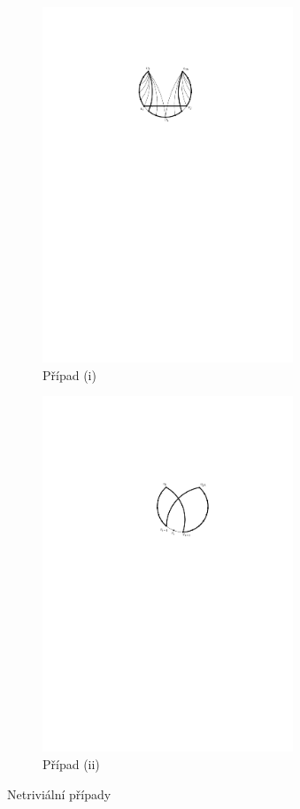 \begin{figure}[h]
\centering
\begin{subfigure}{7.5cm}
\includegraphics[width=7.5cm]{img/nash-williams2.pdf}
\caption{Případ (i)}
\label{dk:nw-i}
\end{subfigure}
\hfill
\begin{subfigure}{7.4cm}
\includegraphics[width=7.5cm]{img/nash-williams3.pdf}
\caption{Případ (ii)}
\label{dk:nw-ii}
\end{subfigure}
\caption{Netriviální případy}
\end{figure}

